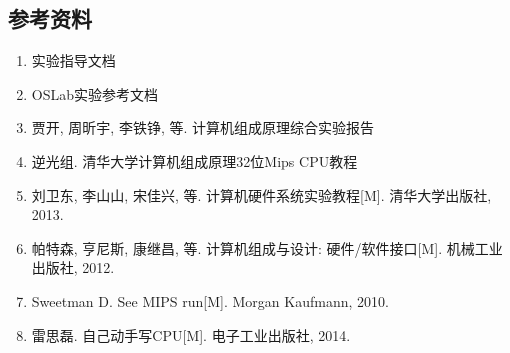 \subsection{参考资料}

\begin{enumerate}

\item 实验指导文档

\item OSLab实验参考文档
	
\item 贾开, 周昕宇, 李铁铮, 等. 计算机组成原理综合实验报告

\item 逆光组. 清华大学计算机组成原理32位Mips CPU教程

\item 刘卫东, 李山山, 宋佳兴, 等. 计算机硬件系统实验教程[M]. 清华大学出版社, 2013.
	
\item 帕特森, 亨尼斯, 康继昌, 等. 计算机组成与设计: 硬件/软件接口[M]. 机械工业出版社, 2012.
	
\item Sweetman D. See MIPS run[M]. Morgan Kaufmann, 2010.

\item 雷思磊. 自己动手写CPU[M]. 电子工业出版社, 2014.

\end{enumerate}
